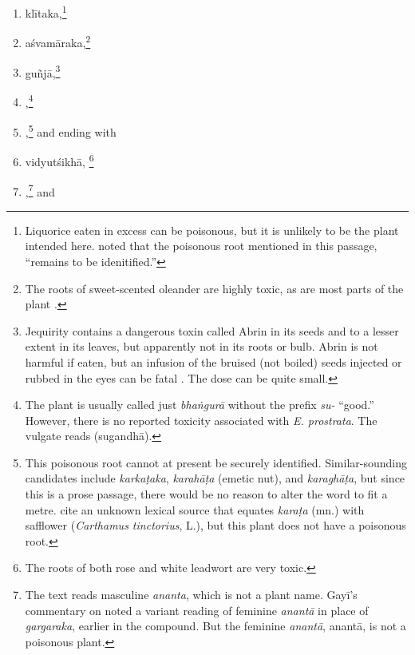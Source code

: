 \begin{translation}
\begin{itemize}
\begin{enumerate}
        \item  \gls{klītaka},\footnote{Liquorice eaten in excess can
    be poisonous, but it is unlikely to be the plant intended
    here.  \citet[124]{gvdb} noted that the poisonous root
    mentioned in this passage, “remains to be idenitified.”}
       
        \item \gls{aśvamāraka},\footnote{The roots of sweet-scented
    oleander are highly toxic, as are most parts of the plant
    \citep{pill-2019}.}
    
        \item \gls{guñjā},\footnote{Jequirity contains a dangerous
    toxin called Abrin in its seeds and to a lesser extent in its
    leaves, but apparently not in its roots or bulb. Abrin is not
    harmful if eaten, but an infusion of the bruised (not boiled)
    seeds injected or rubbed in the eyes can be fatal \citep[\#
    6]{NK}.  The dose can be quite small.}
        
        \item {},\footnote{The plant is usually
    called just \emph{bhaṅgurā} without the prefix \emph{su-}
    “good.”  However, there is no reported toxicity associated
    with \emph{E. prostrata}.  The vulgate reads 
    (\gls{sugandhā}).}
        
       \item {},\footnote{This poisonous root cannot
    at present be securely identified.  Similar-sounding
    candidates include \emph{karkaṭaka}, \emph{karahāṭa} (emetic
    nut), and \emph{karaghāṭa}, but since this is a prose passage,
    there would be no reason to alter the word to fit a metre.
    \citet[255]{moni-sans} cite an unknown lexical source that
    equates \emph{karaṭa} (mn.) with safflower (\emph{Carthamus
    tinctorius}, L.), but this plant does not have a poisonous
    root.} and ending with \item \gls{vidyutśikhā}, \footnote{The
        roots of both rose and white leadwort are very toxic.}

\item {},\footnote{The text reads masculine
    \emph{ananta}, which is not a plant name.  Gayī's commentary on
     noted a variant reading of feminine \emph{anantā} in
    place of \emph{gargaraka}, earlier in the compound. But the feminine
    \emph{anantā}, \gls{anantā}, is not a poisonous plant.} and


\end{enumerate}
\end{itemize}
\end{translation}
